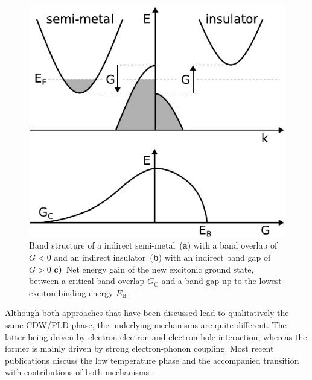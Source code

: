 \begin{figure}[!t]
	\begin{minipage}{0.5\columnwidth}
		\includegraphics[width=\columnwidth]{figs/excitonic_insulator.pdf}
	\end{minipage}
	\hspace{0.04\columnwidth}
	\begin{minipage}{0.45\columnwidth}
		\caption{Band structure of a indirect semi-metal~(\textbf{a}) with a band overlap of $G<0$ and an indirect insulator~(\textbf{b}) with an indirect band gap of $G>0$ \textbf{c)}~Net energy gain of the new excitonic ground state, between a critical band overlap $G_\mathrm{C}$ and a band gap up to the lowest exciton binding energy $E_\mathrm{B}$}
		\label{fig:ei}
	\end{minipage}
\end{figure}

Although both approaches that have been discussed lead to qualitatively the same \ac{CDW}/\ac{PLD} phase, the underlying mechanisms are quite different.
The latter being driven by electron-electron and electron-hole interaction, whereas the former is mainly driven by strong electron-phonon coupling.
Most recent publications discuss the low temperature phase and the accompanied transition with contributions of both mechanisms \cite{cheng2022,hedayat2019}.



